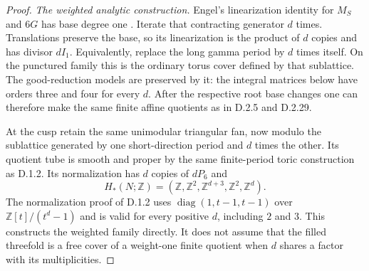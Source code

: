 \begin{proof}
\emph{The weighted analytic construction.}
Engel's linearization identity for $M_S$ and $6G$
has base degree one
\cite[Lemma 2.1 and Remark 8.5]{manEngel26}.
Iterate that contracting generator $d$ times.
Translations preserve the base, so its linearization
is the product of $d$ copies and has divisor $dI_1$.
Equivalently, replace the long gamma period by $d$
times itself. On the punctured family this is the
ordinary torus cover defined by that sublattice.
The good-reduction models are preserved by it:
the integral matrices below have orders three and
four for every $d$. After the respective root base
changes one can therefore make the same finite
affine quotients as in D.2.5 and D.2.29.

At the cusp retain the same unimodular triangular
fan, now modulo the sublattice generated by one
short-direction period and $d$ times the other.
Its quotient tube is smooth and proper by the same
finite-period toric construction as D.1.2. Its
normalization has $d$ copies of $dP_6$ and
\[
 H_*(N;\mathbb Z)
 =(\mathbb Z,\mathbb Z^2,\mathbb Z^{d+3},
                         \mathbb Z^2,\mathbb Z^d).         \tag{D.WE9}
\]
The normalization proof of D.1.2 uses
$\operatorname{diag}(1,t-1,t-1)$ over
$\mathbb Z[t]/(t^d-1)$ and is valid for every positive
$d$, including $2$ and $3$.
This constructs the weighted family directly.
It does not assume that the filled threefold is a
free cover of a weight-one finite quotient when $d$
shares a factor with its multiplicities.


\end{proof}
